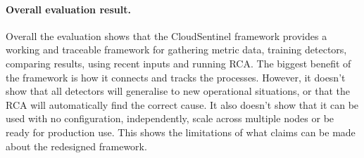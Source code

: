 \paragraph{Overall evaluation result.}

Overall the evaluation shows that the CloudSentinel framework provides a working and traceable framework for gathering metric data, training detectors, comparing results, using recent inputs and running RCA. The biggest benefit of the framework is how it connects and tracks the processes. However, it doesn’t show that all detectors will generalise to new operational situations, or that the RCA will automatically find the correct cause. It also doesn’t show that it can be used with no configuration, independently, scale across multiple nodes or be ready for production use. This shows the limitations of what claims can be made about the redesigned framework.

